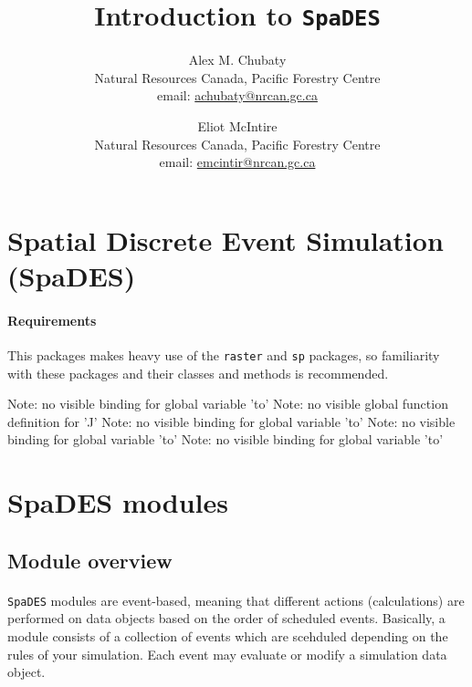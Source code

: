 \documentclass{article}
\title{Introduction to \texttt{SpaDES}}
\author{
  Alex M. Chubaty\\
	\small{Natural Resources Canada, Pacific Forestry Centre}\\
	\small{email: \href{mailto:achubaty@nrcan.gc.ca}{achubaty@nrcan.gc.ca}}
	\and
	Eliot McIntire\\
	\small{Natural Resources Canada, Pacific Forestry Centre}\\
	\small{email: \href{mailto:emcintir@nrcan.gc.ca}{emcintir@nrcan.gc.ca}}
}
\begin{document}


\maketitle

\tableofcontents

\newpage

\section{Spatial Discrete Event Simulation (SpaDES)}

\paragraph{Requirements}
This packages makes heavy use of the \texttt{raster} and \texttt{sp} packages, so familiarity with these packages and their classes and methods is recommended.

\begin{Schunk}
\begin{Soutput}
Note: no visible binding for global variable 'to' 
Note: no visible global function definition for 'J' 
Note: no visible binding for global variable 'to' 
Note: no visible binding for global variable 'to' 
Note: no visible binding for global variable 'to' 
\end{Soutput}
\end{Schunk}


\newpage

\section{SpaDES modules}

\subsection{Module overview}

\paragraph{}
\texttt{SpaDES} modules are event-based, meaning that different actions (calculations) are performed on data objects based on the order of scheduled events. Basically, a module consists of a collection of events which are scehduled depending on the rules of your simulation. Each event may evaluate or modify a simulation data object.
\end{document}
